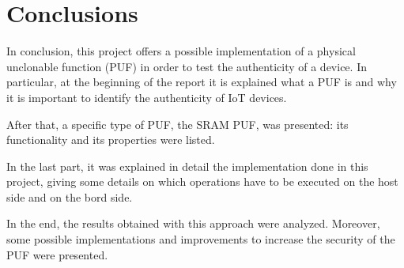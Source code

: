 \chapter{Conclusions}
In conclusion, this project offers a possible implementation of a physical unclonable function (PUF) in order to test the authenticity of a device.
In particular, at the beginning of the report it is explained what a PUF is and why it is important to identify the authenticity of IoT devices.

After that, a specific type of PUF, the SRAM PUF, was presented: its functionality and its properties were listed.

In the last part, it was explained in detail the implementation done in this project, giving some details on which operations have to be executed on the host side and on the bord side.

In the end, the results obtained with this approach were analyzed. Moreover, some possible implementations and improvements to increase the security of the PUF were presented.
